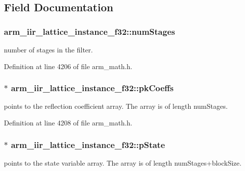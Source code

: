 \subsection{Field Documentation}
\hypertarget{structarm__iir__lattice__instance__f32_af8de449af5efe1f30be82f9ba35587ee}{
\subsubsection[{num\-Stages}]{ arm\-\_\-iir\-\_\-lattice\-\_\-instance\-\_\-f32\-::num\-Stages}}\label{structarm__iir__lattice__instance__f32_af8de449af5efe1f30be82f9ba35587ee}
number of stages in the filter. 

Definition at line 4206 of file arm\-\_\-math.\-h.

\hypertarget{structarm__iir__lattice__instance__f32_aa69fcdd3775e828d450ce1bbd978fa31}{
\subsubsection[{pk\-Coeffs}]{$\ast$ arm\-\_\-iir\-\_\-lattice\-\_\-instance\-\_\-f32\-::pk\-Coeffs}}\label{structarm__iir__lattice__instance__f32_aa69fcdd3775e828d450ce1bbd978fa31}
points to the reflection coefficient array. The array is of length num\-Stages. 

Definition at line 4208 of file arm\-\_\-math.\-h.

\hypertarget{structarm__iir__lattice__instance__f32_a30babe7815510219e6e3d28e6e4a5969}{
\subsubsection[{p\-State}]{$\ast$ arm\-\_\-iir\-\_\-lattice\-\_\-instance\-\_\-f32\-::p\-State}}\label{structarm__iir__lattice__instance__f32_a30babe7815510219e6e3d28e6e4a5969}
points to the state variable array. The array is of length num\-Stages+block\-Size. 

